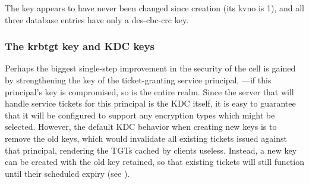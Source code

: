 \documentclass[letterpaper,10pt,english]{sphinxmanual}
\begin{document}
%
\begin{sphinxVerbatim}[commandchars=\\\{\}]
\PYG{p}{[} \PYG{p}{]}
\PYG{p}{[}\PYG{p}{]}
   
   
\PYG{p}{[}\PYG{p}{]}
\PYG{p}{[} \PYG{p}{]}
\PYG{p}{[}\PYG{p}{]}
   
   
\PYG{p}{[}\PYG{p}{]}
\PYG{p}{[} \PYG{p}{]}
\PYG{p}{[}\PYG{p}{]}
   
   
\PYG{p}{[}\PYG{p}{]}
\end{sphinxVerbatim}

The  key appears to have never been changed since creation
(its kvno is 1), and all three database entries have only a des-cbc-crc key.


\subsubsection{The krbtgt key and KDC keys}
\label{\detokenize{admin/advanced/retiring-des:the-krbtgt-key-and-kdc-keys}}
Perhaps the biggest single-step improvement in the security of the cell
is gained by strengthening the key of the ticket-granting service principal,
—if this principal’s key is compromised, so is the
entire realm.  Since the server that will handle service tickets
for this principal is the KDC itself, it is easy to guarantee that it
will be configured to support any encryption types which might be
selected.  However, the default KDC behavior when creating new keys is to
remove the old keys, which would invalidate all existing tickets issued
against that principal, rendering the TGTs cached by clients useless.
Instead, a new key can be created with the old key retained, so that
existing tickets will still function until their scheduled expiry
(see {\hyperref[\detokenize{admin/database:changing-krbtgt-key}]{}}).
\end{document}

